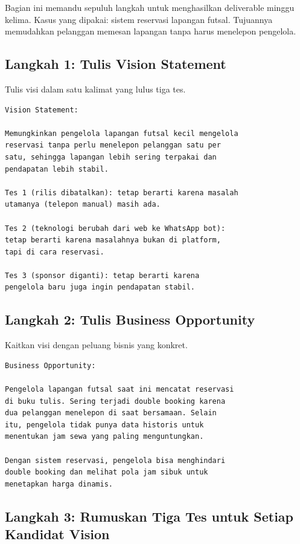 \documentclass[11pt,a4paper]{article}
\begin{document}
Bagian ini memandu sepuluh langkah untuk menghasilkan deliverable minggu kelima. Kasus yang dipakai: sistem reservasi lapangan futsal. Tujuannya memudahkan pelanggan memesan lapangan tanpa harus menelepon pengelola.

\subsection{Langkah 1: Tulis Vision Statement}

Tulis visi dalam satu kalimat yang lulus tiga tes.

\begin{lstlisting}[style=out]
Vision Statement:

Memungkinkan pengelola lapangan futsal kecil mengelola
reservasi tanpa perlu menelepon pelanggan satu per
satu, sehingga lapangan lebih sering terpakai dan
pendapatan lebih stabil.

Tes 1 (rilis dibatalkan): tetap berarti karena masalah
utamanya (telepon manual) masih ada.

Tes 2 (teknologi berubah dari web ke WhatsApp bot):
tetap berarti karena masalahnya bukan di platform,
tapi di cara reservasi.

Tes 3 (sponsor diganti): tetap berarti karena
pengelola baru juga ingin pendapatan stabil.
\end{lstlisting}

\subsection{Langkah 2: Tulis Business Opportunity}

Kaitkan visi dengan peluang bisnis yang konkret.

\begin{lstlisting}[style=out]
Business Opportunity:

Pengelola lapangan futsal saat ini mencatat reservasi
di buku tulis. Sering terjadi double booking karena
dua pelanggan menelepon di saat bersamaan. Selain
itu, pengelola tidak punya data historis untuk
menentukan jam sewa yang paling menguntungkan.

Dengan sistem reservasi, pengelola bisa menghindari
double booking dan melihat pola jam sibuk untuk
menetapkan harga dinamis.
\end{lstlisting}

\subsection{Langkah 3: Rumuskan Tiga Tes untuk Setiap Kandidat Vision}
\end{document}
